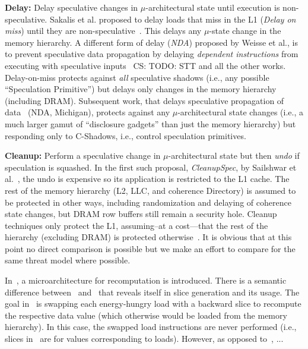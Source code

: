 \item{\textbf{Delay:}} Delay speculative changes in $\mu$-architectural state until execution is non-speculative. Sakalis et al. proposed to delay loads that miss in the L1 (\emph{Delay on miss}) until they are non-speculative~\cite{sakalis+:ISCA2019vp}. This delays any $\mu$-state change in the memory hierarchy. A different form of delay (\emph{NDA}) proposed by Weisse et al., is to prevent speculative data propagation by delaying \emph{dependent instructions} from executing with speculative inputs~\cite{weisse2019nda} {\color{blue}CS: TODO: STT and all the other works}. Delay-on-miss protects against \emph{all} speculative shadows (i.e., any possible ``Speculation Primitive'') but delays only changes in the memory hierarchy (including DRAM). Subsequent work, that delays speculative propagation of data~\cite{weisse2019nda} (NDA, Michigan), protects against any $\mu$-architectural state changes (i.e., a much larger gamut of ``disclosure gadgets'' than just the memory hierarchy) but responding only to C-Shadows, i.e., control speculation primitives.
\item{\textbf{Cleanup:}} Perform a speculative change in $\mu$-architectural state but then \emph{undo} if speculation is squashed. In the first such proposal, \emph{CleanupSpec}, by Sailshwar et al.~\cite{saileshwar2019cleanupspec}, the undo is expensive so its application is restricted to the L1 cache. The rest of the memory hierarchy (L2, LLC, and coherence Directory) is assumed to be protected in other ways, including randomization and delaying of coherence state changes, but DRAM row buffers still remain a security hole.
Cleanup techniques only protect the L1, assuming--at a cost---that the rest of the hierarchy (excluding DRAM) is protected otherwise~\cite{saileshwar2019cleanupspec}. 
\squishend
{\color{red} It is obvious that at this point no direct comparison is possible but we make an effort to compare for the same threat model where possible.}


In~\cite{amnesiac17}, a microarchitecture for  recomputation is introduced. There is a semantic difference between~\cite{amnesiac17} and \arch\ that reveals itself in slice generation and its usage.
The goal in~\cite{amnesiac17} is swapping each energy-hungry
load with a backward slice to recompute the respective data value (which otherwise
would be loaded from the memory hierarchy). In this case, the swapped load
instructions are never performed (i.e., slices in~\cite{amnesiac17} are for values corresponding to loads). However, as opposed to~\cite{amnesiac17}, ... 
